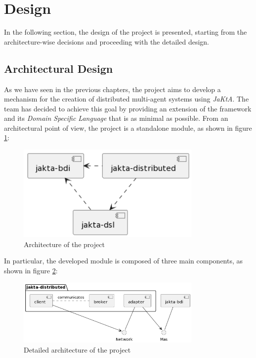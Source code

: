 \section{Design}
In the following section, the design of the project is presented, starting from the architecture-wise decisions and proceeding with the detailed design.

\subsection{Architectural Design}
As we have seen in the previous chapters, the project aims to develop a mechanism for the creation of distributed multi-agent systems using \textit{JaKtA}.
The team has decided to achieve this goal by providing an extension of the framework and its \textit{Domain Specific Language} that is as minimal as possible.
From an architectural point of view, the project is a standalone module, as shown in figure \ref{fig:architecture}:

\begin{figure}[ht!]
    \centering
    \includegraphics[width=0.8\textwidth]{figures/general-architecture.png}
    \caption{Architecture of the project}
    \label{fig:architecture}
\end{figure}

In particular, the developed module is composed of three main components, as shown in figure \ref{fig:detailed-architecture}:

\begin{figure}[ht!]
    \centering
    \includegraphics[width=0.8\textwidth]{figures/detailed-architecture.png}
    \caption{Detailed architecture of the project}
    \label{fig:detailed-architecture}
\end{figure}

